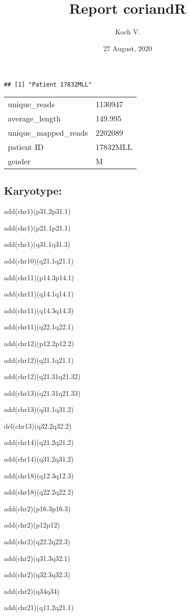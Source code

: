 \documentclass[]{article}
\title{Report coriandR}
\author{Koch V.}
\date{27 August, 2020}
\begin{document}
\maketitle

\begin{verbatim}
## [1] "Patient 17832MLL"
\end{verbatim}

\begin{longtable}[]{@{}ll@{}}
\toprule
\endhead
unique\_reads & 1130947\tabularnewline
average\_length & 149.995\tabularnewline
unique\_mapped\_reads & 2202089\tabularnewline
patient ID & 17832MLL\tabularnewline
gender & M\tabularnewline
\bottomrule
\end{longtable}

\hypertarget{karyotype}{%
\subsection{Karyotype:}\label{karyotype}}

add(chr1)(p31.2p31.1)

add(chr1)(p21.1p21.1)

add(chr1)(q31.1q31.3)

add(chr10)(q21.1q21.1)

add(chr11)(p14.3p14.1)

add(chr11)(q14.1q14.1)

add(chr11)(q14.3q14.3)

add(chr11)(q22.1q22.1)

add(chr12)(p12.2p12.2)

add(chr12)(q21.1q21.1)

add(chr12)(q21.31q21.32)

add(chr13)(q21.31q21.33)

add(chr13)(q31.1q31.2)

del(chr13)(q32.2q32.2)

add(chr14)(q21.2q21.2)

add(chr14)(q31.2q31.2)

add(chr18)(q12.3q12.3)

add(chr18)(q22.2q22.2)

add(chr2)(p16.3p16.3)

add(chr2)(p12p12)

add(chr2)(q22.2q22.3)

add(chr2)(q31.3q32.1)

add(chr2)(q32.3q32.3)

add(chr2)(q34q34)

add(chr21)(q11.2q21.1)
\end{document}
